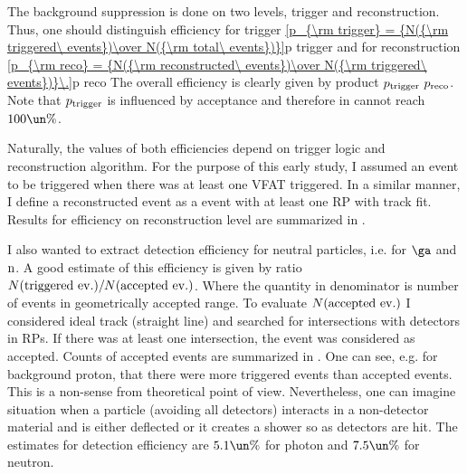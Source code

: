 The background suppression is done on two levels, trigger and reconstruction. Thus, one should distinguish efficiency for trigger
\eqref{p_{\rm trigger} = {N({\rm triggered\ events})\over N({\rm total\ events})}}{p trigger}
and for reconstruction
\eqref{p_{\rm reco} = {N({\rm reconstructed\ events})\over N({\rm triggered\ events})}\.}{p reco}
The overall efficiency is clearly given by product $p_{\rm trigger}\ p_{\rm reco}$. Note that $p_{\rm trigger}$ is influenced by acceptance and therefore in cannot reach $100\un{\%}$.

Naturally, the values of both efficiencies depend on trigger logic and reconstruction algorithm. For the purpose of this early study, I assumed an event to be triggered when there was at least one VFAT triggered. In a similar manner, I define a reconstructed event as a event with at least one RP with track fit. Results for efficiency on reconstruction level are summarized in .

I also wanted to extract detection efficiency for neutral particles, i.e. for $\ga$ and $\rm n$. A good estimate of this efficiency is given by ratio ${N({\rm triggered\ ev.}) / N({\rm accepted\ ev.})}$. Where the quantity in denominator is number of events in geometrically accepted range. To evaluate $ N({\rm accepted\ ev.})$ I considered ideal track (straight line) and searched for intersections with detectors in RPs. If there was at least one intersection, the event was considered as accepted. Counts of accepted events are summarized in . One can see, e.g. for background proton, that there were more triggered events than accepted events. This is a non-sense from theoretical point of view. Nevertheless, one can imagine situation when a particle (avoiding all detectors) interacts in a non-detector material and is either deflected or it creates a shower so as detectors are hit. The estimates for detection efficiency are $5.1\un{\%}$ for photon and $7.5\un{\%}$ for neutron.

